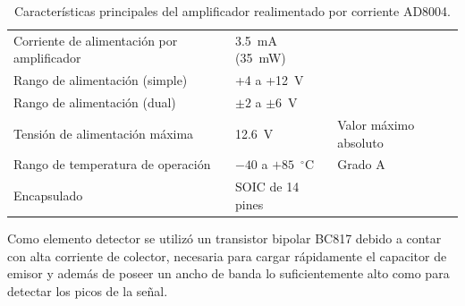 \begin{table}[h]
\begin{tabular}{lll}
    Corriente de alimentación por amplificador & 3.5~mA (35~mW)   &                        \\
    Rango de alimentación (simple)          & +4 a +12~V          &                        \\
    Rango de alimentación (dual)            & $\pm2$ a $\pm6$~V   &                        \\
    Tensión de alimentación máxima          & 12.6~V              & Valor máximo absoluto  \\
    Rango de temperatura de operación       & $-40$ a $+85$~$^{\circ}$C & Grado A          \\
    Encapsulado                             & SOIC de 14 pines    &                        \\
    \bottomrule
  \end{tabular}
  \caption{Características principales del amplificador realimentado por
  corriente AD8004.}
  \label{tab:caracteristicas_ad8004}
\end{table}

Como elemento detector se utilizó un transistor bipolar BC817 debido a contar con alta corriente de colector, necesaria para cargar rápidamente el capacitor de emisor y además de poseer un ancho de banda lo suficientemente alto como para detectar los picos de la señal.

